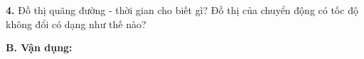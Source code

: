 \documentclass[13pt,a4paper]{article}
\begin{document}
\textbf{4.} Đồ thị quãng đường - thời gian cho biết gì? Đồ thị của chuyển động có tốc độ không đổi có dạng như thế nào?
\par\vspace{1pt}\noindent\dotfill\par\vspace{4pt}\noindent\dotfill\par\vspace{4pt}\noindent\dotfill\par\vspace{4pt}\noindent\dotfill\par\vspace{4pt}\noindent\dotfill\par\vspace{4pt}\noindent\dotfill\par\vspace{4pt}\noindent
\vspace{4pt}
{\color{mySub}\textbf{B. Vận dụng:}}
\end{document}
